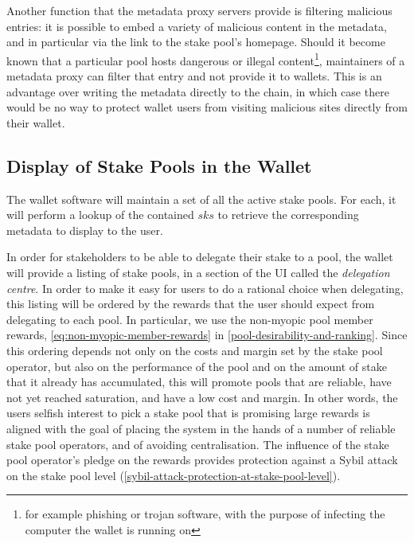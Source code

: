 \documentclass[11pt,a4paper,dvipsnames,twosided]{article}
\begin{document}
Another function that the metadata proxy servers provide is filtering malicious
entries: it is possible to embed a variety of malicious content in the metadata,
and in particular via the link to the stake pool's homepage. Should it become
known that a particular pool hosts dangerous or illegal
content\footnote{for example phishing or trojan software, with the purpose of
  infecting the computer the wallet is running on}, maintainers of
a metadata proxy can filter that entry and not provide it to wallets. This is an
advantage over writing the metadata directly to the chain, in which case there
would be no way to protect wallet users from visiting malicious sites directly
from their wallet.

\subsection{Display of Stake Pools in the Wallet}
\label{display-of-stake-pools-in-the-wallet}

The wallet software will maintain a set of all the active stake pools. For each,
it will perform a lookup of the contained \(sks\) to retrieve the corresponding
metadata to display to the user.

In order for stakeholders to be able to delegate their stake to a pool, the
wallet will provide a listing of stake pools, in a section of the UI called the
\emph{delegation centre}. In order to make it easy for users to do a rational
choice when delegating, this listing will be ordered by the rewards that the
user should expect from delegating to each pool. In particular, we use the
non-myopic pool member rewards, \cref{eq:non-myopic-member-rewards} in
\cref{pool-desirability-and-ranking}. Since this ordering depends not only on
the costs and margin set by the stake pool operator, but also on the performance
of the pool and on the amount of stake that it already has accumulated, this
will promote pools that are reliable, have not yet reached saturation, and have
a low cost and margin. In other words, the users selfish interest to pick a
stake pool that is promising large rewards is aligned with the goal of placing
the system in the hands of a number of reliable stake pool operators, and of
avoiding centralisation. The influence of the stake pool operator's pledge on
the rewards provides protection against a Sybil attack on the stake pool level
(\cref{sybil-attack-protection-at-stake-pool-level}).
\end{document}
